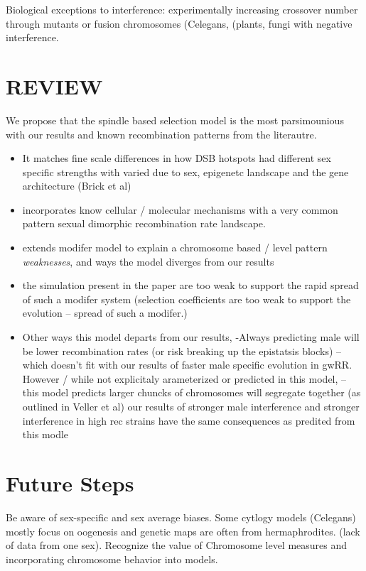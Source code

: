 \documentclass[]{article}
\begin{document}
Biological exceptions to interference: experimentally increasing
crossover number through mutants or fusion chromosomes (Celegans,
(plants, fungi with negative interference.

\section{REVIEW}\label{review}

We propose that the spindle based selection model is the most
parsimounious with our results and known recombination patterns from the
literautre.

\begin{itemize}
\item
  It matches fine scale differences in how DSB hotspots had different
  sex specific strengths with varied due to sex, epigenetc landscape and
  the gene architecture (Brick et al)
\item
  incorporates know cellular / molecular mechanisms with a very common
  pattern sexual dimorphic recombination rate landscape.
\item
  extends modifer model to explain a chromosome based / level pattern
  \emph{weaknesses}, and ways the model diverges from our results
\item
  the simulation present in the paper are too weak to support the rapid
  spread of such a modifer system (selection coefficients are too weak
  to support the evolution -- spread of such a modifer.)
\item
  Other ways this model departs from our results, -Always predicting
  male will be lower recombination rates (or risk breaking up the
  epistatsis blocks) -- which doesn't fit with our results of faster
  male specific evolution in gwRR. However / while not explicitaly
  arameterized or predicted in this model, -- this model predicts larger
  chuncks of chromosomes will segregate together (as outlined in Veller
  et al) our results of stronger male interference and stronger
  interference in high rec strains have the same consequences as
  predited from this modle
\end{itemize}

\section{Future Steps}\label{future-steps}

Be aware of sex-specific and sex average biases. Some cytlogy models
(Celegans) mostly focus on oogenesis and genetic maps are often from
hermaphrodites. (lack of data from one sex). Recognize the value of
Chromosome level measures and incorporating chromosome behavior into
models.
\end{document}
